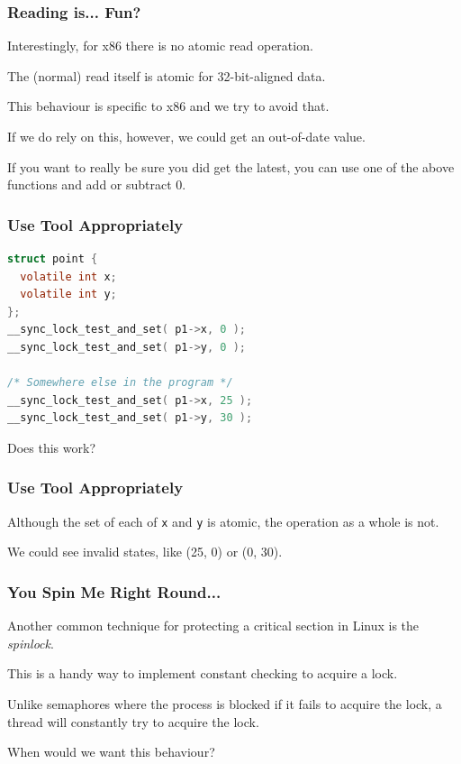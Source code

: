 \begin{frame}
\frametitle{Reading is... Fun?}

Interestingly, for x86 there is no atomic read operation. 

The (normal) read itself is atomic for 32-bit-aligned data. 

This behaviour is specific to x86 and we try to avoid that.

If we do rely on this, however, we could get an out-of-date value. 

If you want to really be sure you did get the latest, you can use one of the above functions and add or subtract 0.


\end{frame}



\begin{frame}[fragile]
	\frametitle{Use Tool Appropriately}

	\begin{lstlisting}[language=C]
struct point {
  volatile int x;
  volatile int y;
};
__sync_lock_test_and_set( p1->x, 0 );
__sync_lock_test_and_set( p1->y, 0 );

/* Somewhere else in the program */
__sync_lock_test_and_set( p1->x, 25 );
__sync_lock_test_and_set( p1->y, 30 );
\end{lstlisting}

	Does this work?

\end{frame}


\begin{frame}
	\frametitle{Use Tool Appropriately}

	Although the set of each of \texttt{x} and \texttt{y} is atomic, the operation as a whole is not.

	We could see invalid states, like (25, 0) or (0, 30).
	
\end{frame}


\begin{frame}
	\frametitle{You Spin Me Right Round...}

	Another common technique for protecting a critical section in Linux is the \textit{spinlock}.

	This is a handy way to implement constant checking to acquire a lock.

	Unlike semaphores where the process is blocked if it fails to acquire the lock, a thread will constantly try to acquire the lock.

	When would we want this behaviour?

\end{frame}


